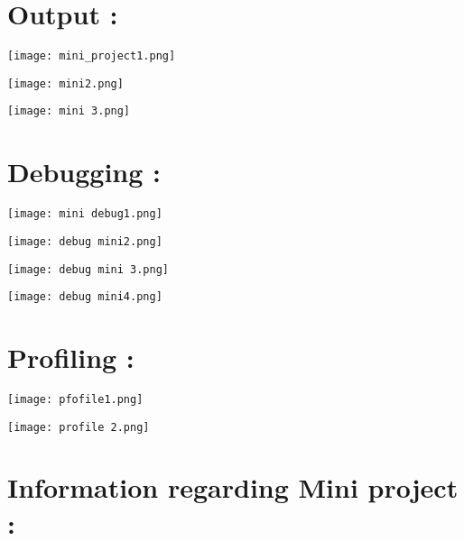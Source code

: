\documentclass[12pt,a4paper]{article}
\begin{document}
\pagebreak
\section{Output :}

\begin{center}
\texttt{[image: mini\_project1.png]}
\end{center}
\pagebreak


\begin{center}
\texttt{[image: mini2.png]}
\end{center}

\pagebreak
\begin{center}
\texttt{[image: mini 3.png]}
\end{center}


\pagebreak
\section{Debugging :}

\begin{center}
\texttt{[image: mini debug1.png]}
\end{center}
\pagebreak


\begin{center}
\texttt{[image: debug mini2.png]}
\end{center}

\pagebreak
\begin{center}
\texttt{[image: debug mini 3.png]}
\end{center}


\pagebreak
\begin{center}
\texttt{[image: debug mini4.png]}
\end{center}

\pagebreak
\section{Profiling :}

\begin{center}
\texttt{[image: pfofile1.png]}
\end{center}
\pagebreak


\begin{center}
\texttt{[image: profile 2.png]}
\end{center}

\pagebreak

\section{Information regarding Mini project :}
\vspace{1cm}
\end{document}
